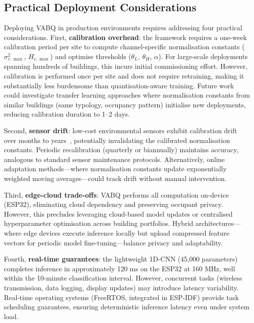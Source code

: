 \subsection{Practical Deployment Considerations}
\label{sec:disc_deployment}

Deploying VABQ in production environments requires addressing four practical considerations. First, \textbf{calibration overhead}: the framework requires a one-week calibration period per site to compute channel-specific normalisation constants ($\sigma_{c,\max}^2$, $H_{c,\max}$) and optimise thresholds ($\theta_L$, $\theta_H$, $\alpha$). For large-scale deployments spanning hundreds of buildings, this incurs initial commissioning effort. However, calibration is performed once per site and does not require retraining, making it substantially less burdensome than quantisation-aware training. Future work could investigate transfer learning approaches where normalisation constants from similar buildings (same typology, occupancy pattern) initialise new deployments, reducing calibration duration to 1--2 days.

Second, \textbf{sensor drift}: low-cost environmental sensors exhibit calibration drift over months to years~\cite{dimitriou2025innovations,enviroiot2025}, potentially invalidating the calibrated normalisation constants. Periodic recalibration (quarterly or biannually) maintains accuracy, analogous to standard sensor maintenance protocols. Alternatively, online adaptation methods---where normalisation constants update exponentially weighted moving averages---could track drift without manual intervention.

Third, \textbf{edge-cloud trade-offs}: VABQ performs all computation on-device (ESP32), eliminating cloud dependency and preserving occupant privacy. However, this precludes leveraging cloud-based model updates or centralised hyperparameter optimisation across building portfolios. Hybrid architectures---where edge devices execute inference locally but upload compressed feature vectors for periodic model fine-tuning---balance privacy and adaptability.

Fourth, \textbf{real-time guarantees}: the lightweight 1D-CNN (45,000 parameters) completes inference in approximately 120 ms on the ESP32 at 160 MHz, well within the 10-minute classification interval. However, concurrent tasks (wireless transmission, data logging, display updates) may introduce latency variability. Real-time operating systems (FreeRTOS, integrated in ESP-IDF) provide task scheduling guarantees, ensuring deterministic inference latency even under system load.

